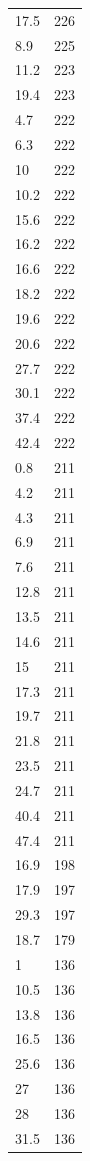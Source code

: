 \begin{table}[ht]
\begin{tabular}{lr}
  17.5 & 226 \\ 
  8.9 & 225 \\ 
  11.2 & 223 \\ 
  19.4 & 223 \\ 
  4.7 & 222 \\ 
  6.3 & 222 \\ 
  10 & 222 \\ 
  10.2 & 222 \\ 
  15.6 & 222 \\ 
  16.2 & 222 \\ 
  16.6 & 222 \\ 
  18.2 & 222 \\ 
  19.6 & 222 \\ 
  20.6 & 222 \\ 
  27.7 & 222 \\ 
  30.1 & 222 \\ 
  37.4 & 222 \\ 
  42.4 & 222 \\ 
  0.8 & 211 \\ 
  4.2 & 211 \\ 
  4.3 & 211 \\ 
  6.9 & 211 \\ 
  7.6 & 211 \\ 
  12.8 & 211 \\ 
  13.5 & 211 \\ 
  14.6 & 211 \\ 
  15 & 211 \\ 
  17.3 & 211 \\ 
  19.7 & 211 \\ 
  21.8 & 211 \\ 
  23.5 & 211 \\ 
  24.7 & 211 \\ 
  40.4 & 211 \\ 
  47.4 & 211 \\ 
  16.9 & 198 \\ 
  17.9 & 197 \\ 
  29.3 & 197 \\ 
  18.7 & 179 \\ 
  1 & 136 \\ 
  10.5 & 136 \\ 
  13.8 & 136 \\ 
  16.5 & 136 \\ 
  25.6 & 136 \\ 
  27 & 136 \\ 
  28 & 136 \\ 
  31.5 & 136 \\ 

\end{tabular}
\end{table}
